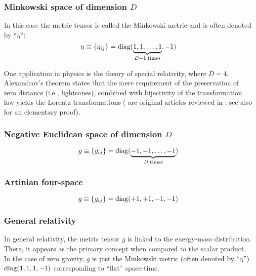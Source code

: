 \subsubsection{Minkowski space of dimension $D$}

In this case the metric tensor is called the Minkowski metric and is often denoted by  ``$\eta$'':
\begin{equation}
\eta \equiv \{\eta_{ij}\}={\rm diag} (\underbrace{1,1,\ldots ,1}_{D-1\; {\rm times}},-1)
\end{equation}


One application in physics is the theory of special relativity,
where $D=4$.
Alexandrov's theorem states that the mere requirement of the preservation of
zero distance (i.e., lightcones), combined with bijectivity of the transformation law
yields the Lorentz transformations
(\cite{alex1,alex2,alex3,alex-col,borchers-heger}
are original articles reviewed in \cite{benz,lester};
see also
\cite{svozil-2001-convention} for an elementary proof).



\subsubsection{Negative Euclidean space of dimension $D$}

\begin{equation}
g\equiv \{g_{ij}\}={\rm diag} (\underbrace{-1,-1,\ldots ,-1}_{D\; {\rm times}})
\end{equation}

\subsubsection{Artinian four-space}

\begin{equation}
g\equiv \{g_{ij}\}={\rm diag} (+1,+1,-1 ,-1)
\end{equation}



\subsubsection{General relativity}

In general relativity, the metric tensor $g$ is linked to the energy-mass distribution.
There, it appears as the primary concept when compared to the scalar product.
In the case of zero gravity, $g$ is just the  Minkowski metric (often denoted by  ``$\eta$'')
${\rm diag} (1,1,1,-1) $ corresponding to ``flat'' space-time.

